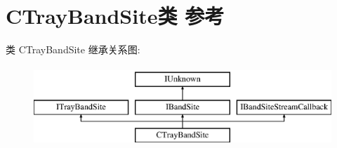 \hypertarget{class_c_tray_band_site}{}\section{C\+Tray\+Band\+Site类 参考}
\label{class_c_tray_band_site}
类 C\+Tray\+Band\+Site 继承关系图\+:\begin{figure}[H]
\begin{center}
\leavevmode
\includegraphics[height=3.000000cm]{class_c_tray_band_site}
\end{center}
\end{figure}
